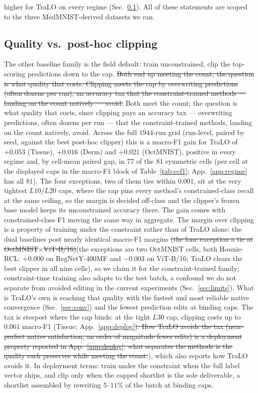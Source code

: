 \documentclass[10pt]{article}
\newcommand{\del}[1]{{\color{red}\sout{#1}}}
\begin{document}
higher for TraLO on every regime (Sec.~\ref{sec:deploy}). All of these
statements are scoped to the three MedMNIST-derived datasets we ran.

\subsection{Quality vs.\ post-hoc clipping}
\label{sec:deploy}

The other baseline family is the field default: train unconstrained, clip
the top-scoring predictions down to the cap. \del{Both end up meeting the
count; the question is what quality that costs. Clipping meets the cap by
overwriting predictions (often dozens per run), an accuracy tax that the
constraint-trained methods --- landing on the count natively --- avoid.}%
{\color{blue}Both meet the count; the question is what quality that costs,
since clipping pays an accuracy tax --- overwriting predictions, often dozens
per run --- that the constraint-trained methods, landing on the count natively,
avoid.}
Across the full $1944$-run grid (run-level, paired by seed, against the
best post-hoc clipper) this is a macro-F1 gain for TraLO of $+0.053$
(Tissue), $+0.016$ (Derm) and $+0.021$ (OctMNIST), positive in every
regime and, by cell-mean paired gap, in $77$ of the $81$ symmetric cells
(per cell at the displayed caps in the macro-F1 block of
Table~\ref{tab:ccf1}; App.~\ref{app:regime} has all $81$). The four
exceptions, two of them ties within $0.001$, sit at the very tightest
$L10$/$L20$ caps, where the cap pins every method's constrained-class
recall at the same ceiling, so the margin is decided off-class and the
clipper's frozen base model keeps its unconstrained accuracy there. The
gain comes with constrained-class F1 moving the same way in aggregate.
The margin over clipping is a property of training under the constraint
rather than of TraLO alone: the dual baselines post nearly identical
macro-F1 margins \del{(the lone exception a tie at OctMNIST$\times$ViT-B/16)}{\color{blue}(the
exceptions are two OctMNIST cells, both Hounie-RCL: $+0.000$ on RegNetY-400MF and
$-0.003$ on ViT-B/16; TraLO clears the best clipper in all nine cells)}, so we
claim it for the constraint-trained family; constraint-time training also
adapts to the test batch, a confound we do not separate from avoided
editing in the current experiments (Sec.~\ref{sec:limits}). What is
TraLO's own is reaching that quality with the fastest and most reliable
native convergence (Sec.~\ref{sec:conv}) and the fewest prediction edits
at binding caps. The tax is steepest where the cap binds: at the tight
$L30$ cap, clipping costs up to $0.061$ macro-F1 (Tissue;
App.~\ref{app:deploy}\del{). How TraLO avoids the tax (near-perfect native
satisfaction, an order of magnitude fewer edits) is a deployment property
reported in App.~\ref{app:deploy}: what separates the methods is the
quality each preserves while meeting the count.}{\color{blue}), which also
reports how TraLO avoids it.} In deployment terms:
train under the constraint when the full label vector ships, and clip only
when the capped shortlist is the sole deliverable, a shortlist assembled
by rewriting $5$--$11\%$ of the batch at binding caps.
\end{document}
